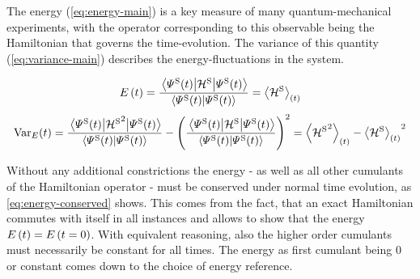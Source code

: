 The energy \energyOft (\autoref{eq:energy-main}) is a key measure of many quantum-mechanical experiments, with the operator corresponding to this observable being the Hamiltonian that governs the time-evolution.
The variance \varianceOft of this quantity (\autoref{eq:variance-main}) describes the energy-fluctuations in the system.

\begin{equation}
    \label{eq:energy-main}
    \energyOft = \frac{\bracketHelper{\psiOfT[\schroedingerPicture]}{\pictureHamiltonian[\schroedingerPicture]}{\psiOfT[\schroedingerPicture]}}{\braketHelper{\psiOfT[\schroedingerPicture]}{\psiOfT[\schroedingerPicture]}}
       = \timeExpectationVal{\pictureHamiltonian[\schroedingerPicture]}
\end{equation}
\begin{equation}
    \label{eq:variance-main}
    \varianceOft = \frac{\bracketHelper{\psiOfT[\schroedingerPicture]}{{\pictureHamiltonian[\schroedingerPicture]}^2}{\psiOfT[\schroedingerPicture]}}{\braketHelper{\psiOfT[\schroedingerPicture]}{\psiOfT[\schroedingerPicture]}}-\left(\frac{\bracketHelper{\psiOfT[\schroedingerPicture]}{\pictureHamiltonian[\schroedingerPicture]}{\psiOfT[\schroedingerPicture]}}{\braketHelper{\psiOfT[\schroedingerPicture]}{\psiOfT[\schroedingerPicture]}}\right)^2
       = \timeExpectationVal{{\pictureHamiltonian[\schroedingerPicture]}^2} - {\timeExpectationVal{\pictureHamiltonian[\schroedingerPicture]}}^2
\end{equation}

Without any additional constrictions %
the energy - as well as all other cumulants of the Hamiltonian operator - must be conserved under normal time evolution, as \autoref{eq:energy-conserved} shows. 
This comes from the fact, that an exact Hamiltonian commutes with itself in all instances and allows to show that the energy $\energyOft = \energyOft[t=0]$.
With equivalent reasoning, also the higher order cumulants must necessarily be constant for all times.
The energy as first cumulant %
being 0 or constant comes down to the choice of energy reference.

